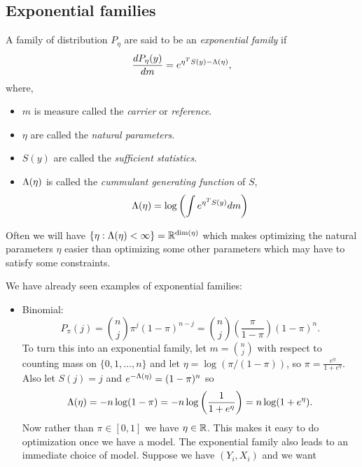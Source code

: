 \subsection{Exponential families}
A family of distribution $P_\eta$ are said to be an \emph{exponential family} if 
\[\frac{dP_\eta(y)}{dm} = e^{\eta^T S(y) - \Lambda(\eta)}, \]
where,
\begin{itemize}
    \item $m$ is measure called the \emph{carrier} or \emph{reference}.
    \item $\eta$ are called the \emph{natural parameters}.
    \item $S(y)$ are called the \emph{sufficient statistics}.
    \item $\Lambda(\eta)$ is called the \emph{cummulant generating function} of $S$,
    \[\Lambda(\eta) = \log\left(\int e^{\eta^T S(y)}dm\right) \]
\end{itemize}
\begin{remark}
    Often we will have $\{\eta : \Lambda(\eta) < \infty\} = {\mathbb R}^{\dim(\eta)}$ which makes optimizing the natural parameters $\eta$ easier than optimizing some other parameters which may have to satisfy some constraints.
\end{remark}
\begin{examples}
    We have already seen examples of exponential families:
    \begin{itemize}
        \item Binomial:
        \[P_\pi(j) = \binom{n}{j}\pi^j (1-\pi)^{n-j} =\binom{n}{j}\left(\frac{\pi}{1-\pi}\right)(1-\pi)^{n}. \]
        To turn this into an exponential family, let $m = \binom{n}{j}$ with respect to counting mass on $\{0,1,\ldots,n\}$ and let $\eta = \log(\pi/(1-\pi))$, so $\pi = \frac{e^\eta}{1+e^{\eta}}$. Also let $S(j)=j$ and $e^{-\Lambda(\eta)} =(1-\pi)^n$ so 
        \[\Lambda(\eta) = -n\log(1-\pi)=-n\log\left(\frac{1}{1+e^{\eta}}\right)=n\log(1+e^{\eta}).\]
        Now rather than $\pi \in [0,1]$ we have $\eta \in {\mathbb R}$. This makes it easy to do optimization once we have a model. The exponential family also leads to an immediate choice of model. Suppose we have $(Y_i,X_i)$ and we want 
    \end{itemize}
\end{examples}
